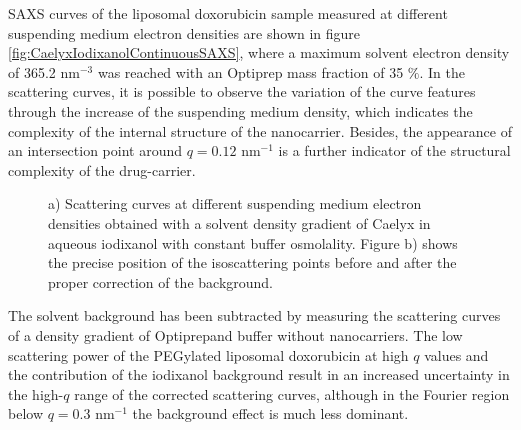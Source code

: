 SAXS curves of the liposomal doxorubicin sample measured at different suspending medium electron densities are shown in figure \ref{fig:CaelyxIodixanolContinuousSAXS}, where a maximum solvent electron density of 365.2 nm$^{-3}$ was reached with an Optiprep \textregistered mass fraction of 35 $\%$. In the scattering curves, it is possible to observe the variation of the curve features through the increase of the suspending medium density, which indicates the complexity of the internal structure of the nanocarrier. Besides, the appearance of an intersection point around $q = 0.12$ nm$^{-1}$ is a further indicator of the structural complexity of the drug-carrier.

\begin{figure}
	\centering
		\caption[Continuous contrast variation experimental data of Caelyx.]{ a) Scattering curves at different suspending medium electron densities obtained with a solvent density gradient of Caelyx in aqueous iodixanol with constant buffer osmolality. Figure b) shows the precise position of the isoscattering points before and after the proper correction of the background.}
\end{figure}

The solvent background has been subtracted by measuring the scattering curves of a density gradient of Optiprep\textregistered and buffer without nanocarriers. The low scattering power of the PEGylated liposomal doxorubicin at high $q$ values and the contribution of the iodixanol background result in an increased uncertainty in the high-$q$ range of the corrected scattering curves, although in the Fourier region below $q = 0.3$ nm$^{-1}$ the background effect is much less dominant.

